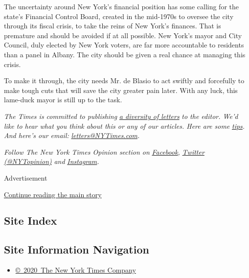 The uncertainty around New York's financial position has some calling
for the state's Financial Control Board, created in the mid-1970s to
oversee the city through its fiscal crisis, to take the reins of New
York's finances. That is premature and should be avoided if at all
possible. New York's mayor and City Council, duly elected by New York
voters, are far more accountable to residents than a panel in Albany.
The city should be given a real chance at managing this crisis.

To make it through, the city needs Mr. de Blasio to act swiftly and
forcefully to make tough cuts that will save the city greater pain
later. With any luck, this lame-duck mayor is still up to the task.

\emph{The Times is committed to publishing}
\href{https://www.nytimes3xbfgragh.onion/2019/01/31/opinion/letters/letters-to-editor-new-york-times-women.html}{\emph{a
diversity of letters}} \emph{to the editor. We'd like to hear what you
think about this or any of our articles. Here are some}
\href{https://help.nytimes3xbfgragh.onion/hc/en-us/articles/115014925288-How-to-submit-a-letter-to-the-editor}{\emph{tips}}\emph{.
And here's our email:}
\href{mailto:letters@NYTimes.com}{\emph{letters@NYTimes.com}}\emph{.}

\emph{Follow The New York Times Opinion section on}
\href{https://www.facebookcorewwwi.onion/nytopinion}{\emph{Facebook}}\emph{,}
\href{http://twitter.com/NYTOpinion}{\emph{Twitter (@NYTopinion)}}
\emph{and}
\href{https://www.instagram.com/nytopinion/}{\emph{Instagram}}\emph{.}

Advertisement

\protect\hyperlink{after-bottom}{Continue reading the main story}

\hypertarget{site-index}{%
\subsection{Site Index}\label{site-index}}

\hypertarget{site-information-navigation}{%
\subsection{Site Information
Navigation}\label{site-information-navigation}}

\begin{itemize}
\tightlist
\item
  \href{https://help.nytimes3xbfgragh.onion/hc/en-us/articles/115014792127-Copyright-notice}{©~2020~The
  New York Times Company}
\end{itemize}

